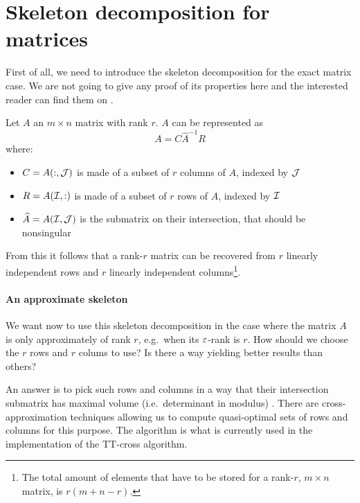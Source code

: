 \section{Skeleton decomposition for matrices}
First of all, we need to introduce the skeleton decomposition for the exact matrix case. We are not going to give any proof of its properties here and the interested reader can find them on \cite{goreinov1997theory,gantmacher1959matrix}.

\begin{Teo}
  Let $A$ an $m \times n$ matrix with rank $r$. $A$ can be represented as
  \begin{equation} \label{def:skeleton}
    A = C \hat{A}^{-1} R
  \end{equation}
  where:
  \begin{itemize}
  \item $C = A(:,\mathcal{J})$ is made of a subset of $r$ columns of $A$, indexed by $\mathcal{J}$
  \item $R = A(\mathcal{I},:)$ is made of a subset of $r$ rows of $A$, indexed by $\mathcal{I}$
  \item $\widehat{A} = A(\mathcal{I},\mathcal{J})$ is the submatrix on their intersection, that should be nonsingular
  \end{itemize}
\end{Teo}

From this it follows that a rank-$r$ matrix can be recovered from $r$ linearly independent rows and $r$ linearly independent columns\footnote{The total amount of elements that have to be stored for a rank-$r$, $m \times n$ matrix, is $r(m+n-r)$.}.

\paragraph{An approximate skeleton}
We want now to use this skeleton decomposition in the case where the matrix $A$ is only approximately of rank $r$, e.g.\ when its $\varepsilon$-rank is $r$.
How should we choose the $r$ rows and $r$ colums to use? Is there a way yielding better results than others?

An answer is to pick such rows and columns in a way that their intersection submatrix has maximal volume (i.e.\ determinant in modulus) . There are cross-approximation techniques allowing us to compute quasi-optimal sets of rows and columns for this purpose. The   algorithm is what is currently used in the implementation of the TT-cross algorithm.

